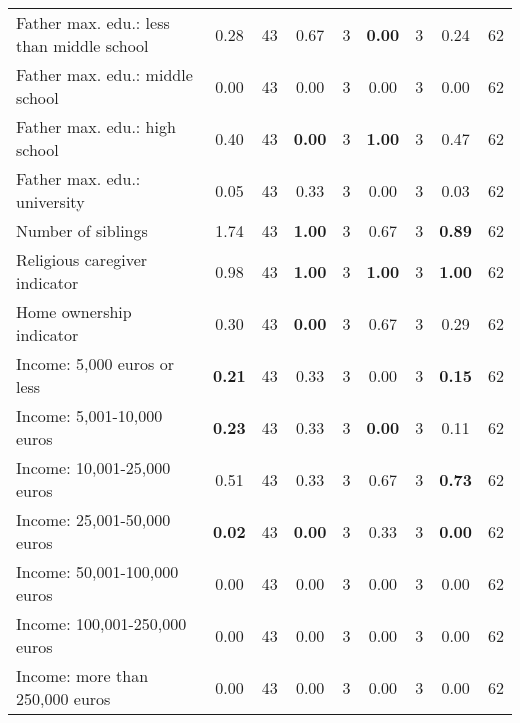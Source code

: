 \begin{tabular}{l c c c c c c c c}
Father max. edu.: less than middle school &      0.28 &        43 &      0.67 &         3 & \textbf{     0.00} &         3 &      0.24 &        62 \\
Father max. edu.: middle school &      0.00 &        43 &      0.00 &         3 &      0.00 &         3 &      0.00 &        62 \\
Father max. edu.: high school &      0.40 &        43 & \textbf{     0.00} &         3 & \textbf{     1.00} &         3 &      0.47 &        62 \\
Father max. edu.: university &      0.05 &        43 &      0.33 &         3 &      0.00 &         3 &      0.03 &        62 \\
Number of siblings &      1.74 &        43 & \textbf{     1.00} &         3 &      0.67 &         3 & \textbf{     0.89} &        62 \\
Religious caregiver indicator &      0.98 &        43 & \textbf{     1.00} &         3 & \textbf{     1.00} &         3 & \textbf{     1.00} &        62 \\
Home ownership indicator &      0.30 &        43 & \textbf{     0.00} &         3 &      0.67 &         3 &      0.29 &        62 \\
Income: 5,000 euros or less & \textbf{     0.21} &        43 &      0.33 &         3 &      0.00 &         3 & \textbf{     0.15} &        62 \\
Income: 5,001-10,000 euros & \textbf{     0.23} &        43 &      0.33 &         3 & \textbf{     0.00} &         3 &      0.11 &        62 \\
Income: 10,001-25,000 euros &      0.51 &        43 &      0.33 &         3 &      0.67 &         3 & \textbf{     0.73} &        62 \\
Income: 25,001-50,000 euros & \textbf{     0.02} &        43 & \textbf{     0.00} &         3 &      0.33 &         3 & \textbf{     0.00} &        62 \\
Income: 50,001-100,000 euros &      0.00 &        43 &      0.00 &         3 &      0.00 &         3 &      0.00 &        62 \\
Income: 100,001-250,000 euros &      0.00 &        43 &      0.00 &         3 &      0.00 &         3 &      0.00 &        62 \\
Income: more than 250,000 euros &      0.00 &        43 &      0.00 &         3 &      0.00 &         3 &      0.00 &        62 \\
\bottomrule
\end{tabular}
